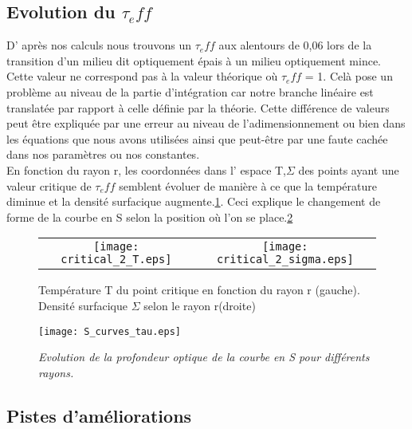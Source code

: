 \subsection{Evolution du $\tau_eff$}

D' après nos calculs nous trouvons un $\tau_eff$ aux alentours de 0,06 lors de la transition d'un milieu dit optiquement épais à un milieu optiquement mince. Cette valeur ne correspond pas à la valeur théorique où $\tau_eff$ = 1. 
Celà pose un problème au niveau de la partie d'intégration car notre branche linéaire est translatée par rapport à celle définie par la théorie. 
Cette différence de valeurs peut être expliquée par une erreur au niveau de l’adimensionnement ou bien dans les équations que nous avons utilisées ainsi que peut-être par une faute cachée dans nos paramètres ou nos constantes. 
\\
En fonction du rayon r, les coordonnées dans l' espace {T,$\Sigma$} des points ayant une valeur critique de $\tau_eff$ semblent évoluer de manière à ce que la température diminue et la densité surfacique augmente.\ref{Fig::fctR}. Ceci explique le changement de forme de la courbe en S selon la position où l'on se place.\ref{Fig::3}

\begin{figure}[htb!]
\centering
\begin{tabular}{cc} 
\texttt{[image: critical\_2\_T.eps]} &
\texttt{[image: critical\_2\_sigma.eps]} \\
\end{tabular}
  \caption{Température T du point critique en fonction du rayon r (gauche). Densité surfacique $\Sigma$ selon le rayon r(droite)}
\label{Fig::fctR}
\end{figure}
  

\begin{figure}[htb!]
	\centering
	\texttt{[image: S\_curves\_tau.eps]}
	\caption{\textit{Evolution de la profondeur optique de la courbe en S pour différents rayons.}  }
	\label{Fig::3}
\end{figure}

\subsection{Pistes d'améliorations}

